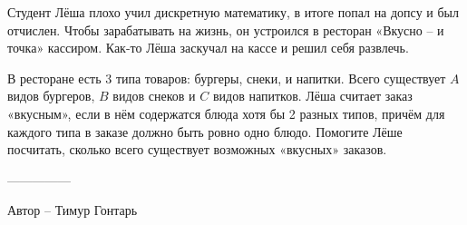 \question
Студент Лёша плохо учил дискретную математику, в итоге попал на допсу и был отчислен. Чтобы зарабатывать на жизнь, он устроился в ресторан «Вкусно – и точка» кассиром. Как-то Лёша заскучал на кассе и решил себя развлечь.

В ресторане есть 3 типа товаров: бургеры, снеки, и напитки. Всего существует $A$ видов бургеров, $B$ видов снеков и $C$ видов напитков. Лёша считает заказ «вкусным», если в нём содержатся блюда хотя бы 2 разных типов, причём для каждого типа в заказе должно быть ровно одно блюдо. Помогите Лёше посчитать, сколько всего существует возможных «вкусных» заказов.

---------------

Автор -- Тимур Гонтарь
